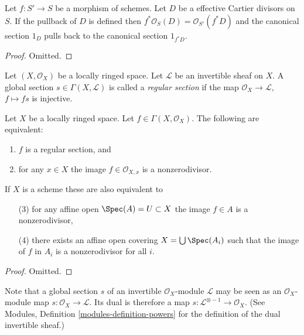 \begin{lemma}
\label{lemma-pullback-effective-Cartier-divisors}
Let $f : S' \to S$ be a morphism of schemes.
Let $D$ be a effective Cartier divisors on $S$.
If the pullback of $D$ is defined then
$f^*\mathcal{O}_S(D) = \mathcal{O}_{S'}(f^*D)$
and the canonical section $1_D$ pulls back to
the canonical section $1_{f^*D}$.
\end{lemma}

\begin{proof}
Omitted.
\end{proof}

\begin{definition}
\label{definition-regular-section}
Let $(X, \mathcal{O}_X)$ be a locally ringed space.
Let $\mathcal{L}$ be an invertible sheaf on $X$.
A global section $s \in \Gamma(X, \mathcal{L})$ is called a
{\it regular section} if the map $\mathcal{O}_X \to \mathcal{L}$,
$f \mapsto fs$ is injective.
\end{definition}

\begin{lemma}
\label{lemma-regular-section-structure-sheaf}
Let $X$ be a locally ringed space. Let $f \in \Gamma(X, \mathcal{O}_X)$.
The following are equivalent:
\begin{enumerate}
\item $f$ is a regular section, and
\item for any $x \in X$ the image $f \in \mathcal{O}_{X, x}$
is a nonzerodivisor.
\end{enumerate}
If $X$ is a scheme these are also equivalent to
\begin{enumerate}
\item[(3)] for any affine open $\Spec(A) = U \subset X$
the image $f \in A$ is a nonzerodivisor,
\item[(4)] there exists an affine open covering
$X = \bigcup \Spec(A_i)$ such that
the image of $f$ in $A_i$ is a nonzerodivisor for all $i$.
\end{enumerate}
\end{lemma}

\begin{proof}
Omitted.
\end{proof}

\noindent
Note that a global section $s$ of an invertible $\mathcal{O}_X$-module
$\mathcal{L}$ may be seen as an $\mathcal{O}_X$-module map
$s : \mathcal{O}_X \to \mathcal{L}$. Its dual is therefore a
map $s : \mathcal{L}^{\otimes -1} \to \mathcal{O}_X$.
(See Modules, Definition \ref{modules-definition-powers}
for the definition of the dual invertible sheaf.)

